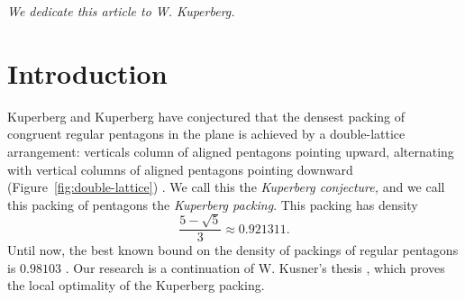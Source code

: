 
% 



\def\area{\op{area}}
\def\areta{\op{areta}}
\def\c{{\mathbf c}}
\def\K{\op{K}}
\def\aK{a_K}
\def\rat{\Rightarrow}
\def\ra#1{\Rightarrow_{#1}}
\def\na#1{{\not\Rightarrow}_{#1}}

\def\epso{\epsilon_0}
\def\C{\mathcal C}
\def\S{\mathcal S}
\def\N{\mathcal N}
\def\cong{\equiv}
\def\r{{\mathbf r}}
\def\bl{\bar\ell}

\def\smalldot#1{\draw[fill=black] (#1) node [inner sep=0.8pt,shape=circle,fill=black] {}}
\def\graydot#1{\draw[fill=gray] (#1) node [inner sep=1.3pt,shape=circle,fill=gray] {}}
\def\whitedot#1{\draw[fill=gray] (#1) node [inner sep=1.3pt,shape=circle,fill=white,draw=black] {}}

\def\pent#1#2#3#4{%
\draw[red] (#1,#2) + (#3:#4cm) -- + (#3+72:#4cm) -- +(#3+144:#4cm) -- +(#3+216:#4cm) -- + (#3+288:#4cm) -- cycle
}

\def\pen#1#2#3{%
\draw[red] (#1,#2) + (#3:1cm) -- + (#3+72:1cm) -- +(#3+144:1cm) -- +(#3+216:1cm) -- + (#3+288:1cm) -- cycle
}

\def\threepent#1#2#3#4#5#6#7#8#9{%
\pen{#1}{#2}{#3};
\pen{#4}{#5}{#6};
\pen{#7}{#8}{#9};
\draw[blue] (#1,#2) -- (#4,#5) -- (#7,#8) -- cycle
}

\def\threepentnoD#1#2#3#4#5#6#7#8#9{%
\pen{#1}{#2}{#3};
\pen{#4}{#5}{#6};
\pen{#7}{#8}{#9}
}


\centerline{\it We dedicate this article to W. Kuperberg.}

\section{Introduction}

Kuperberg and Kuperberg
 have conjectured that the
densest packing of congruent regular pentagons in the plane is
achieved by a double-lattice arrangement: verticals column of aligned
pentagons pointing upward, alternating with vertical columns of
aligned pentagons pointing downward (Figure~\ref{fig:double-lattice}) \cite{Kup}.  We call this the {\it Kuperberg
  conjecture,}  and we call this packing of pentagons the {\it Kuperberg packing}.
This packing has density
\[
\frac{5 - \sqrt{5}}3 \approx 0.921311.
\] %
Until now, the best known bound on the density of packings of regular
pentagons is $0.98103$ \cite{Val}.
Our research is a continuation of W. Kusner's thesis \cite{Kus}, which proves
the local optimality of the Kuperberg packing.


